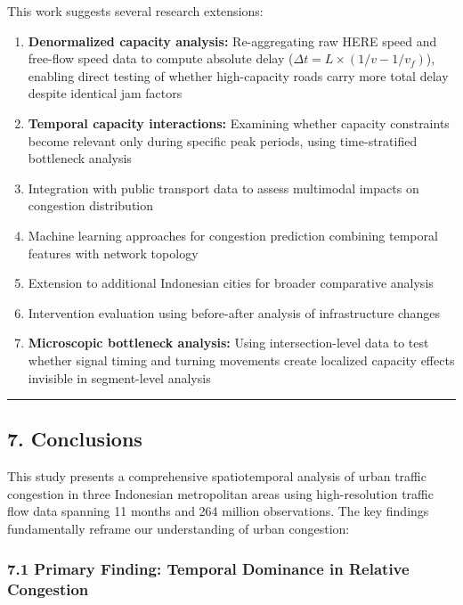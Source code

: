 \documentclass[
  12pt,
]{article}
\providecommand{\tightlist}{%
  \setlength{\itemsep}{0pt}\setlength{\parskip}{0pt}}
\begin{document}
This work suggests several research extensions:

\begin{enumerate}
\def\labelenumi{\arabic{enumi}.}
\tightlist
\item
  \textbf{Denormalized capacity analysis:} Re-aggregating raw HERE speed and free-flow speed data to compute absolute delay (\(\Delta t = L \times (1/v - 1/v_f)\)), enabling direct testing of whether high-capacity roads carry more total delay despite identical jam factors
\item
  \textbf{Temporal capacity interactions:} Examining whether capacity constraints become relevant only during specific peak periods, using time-stratified bottleneck analysis
\item
  Integration with public transport data to assess multimodal impacts on congestion distribution
\item
  Machine learning approaches for congestion prediction combining temporal features with network topology
\item
  Extension to additional Indonesian cities for broader comparative analysis
\item
  Intervention evaluation using before-after analysis of infrastructure changes
\item
  \textbf{Microscopic bottleneck analysis:} Using intersection-level data to test whether signal timing and turning movements create localized capacity effects invisible in segment-level analysis
\end{enumerate}

\begin{center}\rule{0.5\linewidth}{0.5pt}\end{center}

\subsection{7. Conclusions}\label{conclusions}

This study presents a comprehensive spatiotemporal analysis of urban traffic congestion in three Indonesian metropolitan areas using high-resolution traffic flow data spanning 11 months and 264 million observations. The key findings fundamentally reframe our understanding of urban congestion:

\subsubsection{7.1 Primary Finding: Temporal Dominance in Relative Congestion}\label{primary-finding-temporal-dominance-in-relative-congestion}
\end{document}
